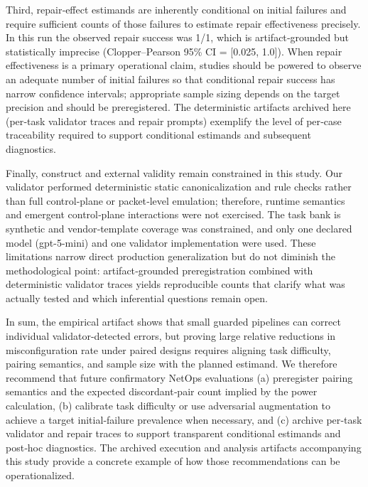 \documentclass[conference]{IEEEtran}
\begin{document}
Third, repair‑effect estimands are inherently conditional on initial failures and require sufficient counts of those failures to estimate repair effectiveness precisely. In this run the observed repair success was 1/1, which is artifact‑grounded but statistically imprecise (Clopper--Pearson 95\% CI = [0.025, 1.0]). When repair effectiveness is a primary operational claim, studies should be powered to observe an adequate number of initial failures so that conditional repair success has narrow confidence intervals; appropriate sample sizing depends on the target precision and should be preregistered. The deterministic artifacts archived here (per‑task validator traces and repair prompts) exemplify the level of per‑case traceability required to support conditional estimands and subsequent diagnostics.

Finally, construct and external validity remain constrained in this study. Our validator performed deterministic static canonicalization and rule checks rather than full control‑plane or packet‑level emulation; therefore, runtime semantics and emergent control‑plane interactions were not exercised. The task bank is synthetic and vendor‑template coverage was constrained, and only one declared model (gpt-5-mini) and one validator implementation were used. These limitations narrow direct production generalization but do not diminish the methodological point: artifact‑grounded preregistration combined with deterministic validator traces yields reproducible counts that clarify what was actually tested and which inferential questions remain open.

In sum, the empirical artifact shows that small guarded pipelines can correct individual validator‑detected errors, but proving large relative reductions in misconfiguration rate under paired designs requires aligning task difficulty, pairing semantics, and sample size with the planned estimand. We therefore recommend that future confirmatory NetOps evaluations (a) preregister pairing semantics and the expected discordant‑pair count implied by the power calculation, (b) calibrate task difficulty or use adversarial augmentation to achieve a target initial‑failure prevalence when necessary, and (c) archive per‑task validator and repair traces to support transparent conditional estimands and post‑hoc diagnostics. The archived execution and analysis artifacts accompanying this study provide a concrete example of how those recommendations can be operationalized.
\end{document}
